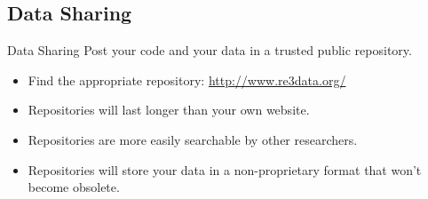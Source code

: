 \documentclass{beamer}
\begin{document}
 { %
    \begin{frame}[plain, label=AEAreg]
     \end{frame}
}
 { %
    \begin{frame}[plain, label=AEAreg]
     \end{frame}
}

\subsection*{Data Sharing}
\begin{frame}{Data Sharing}
Post your code and your data in a trusted public repository.
\begin{itemize}[<.->]
\item
Find the appropriate repository: \url{http://www.re3data.org/}
\item
Repositories will last longer than your own website.
\item
Repositories are more easily searchable by other researchers.
\item
Repositories will store your data in a non-proprietary format that won't become obsolete.
\end{itemize}
\end{frame}
\end{document}
